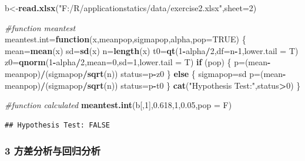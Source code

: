 \documentclass[]{article}
\newenvironment{Shaded}{\begin{snugshade}}{\end{snugshade}}
\newcommand{\KeywordTok}[1]{\textcolor[rgb]{0.13,0.29,0.53}{\textbf{#1}}}
\newcommand{\DataTypeTok}[1]{\textcolor[rgb]{0.13,0.29,0.53}{#1}}
\newcommand{\DecValTok}[1]{\textcolor[rgb]{0.00,0.00,0.81}{#1}}
\newcommand{\FloatTok}[1]{\textcolor[rgb]{0.00,0.00,0.81}{#1}}
\newcommand{\StringTok}[1]{\textcolor[rgb]{0.31,0.60,0.02}{#1}}
\newcommand{\CommentTok}[1]{\textcolor[rgb]{0.56,0.35,0.01}{\textit{#1}}}
\newcommand{\OtherTok}[1]{\textcolor[rgb]{0.56,0.35,0.01}{#1}}
\newcommand{\ControlFlowTok}[1]{\textcolor[rgb]{0.13,0.29,0.53}{\textbf{#1}}}
\newcommand{\OperatorTok}[1]{\textcolor[rgb]{0.81,0.36,0.00}{\textbf{#1}}}
\newcommand{\NormalTok}[1]{#1}
\begin{document}
\begin{Shaded}
\begin{Highlighting}[]
\NormalTok{b<-}\KeywordTok{read.xlsx}\NormalTok{(}\StringTok{"F:/R/applicationstatics/data/exercise2.xlsx"}\NormalTok{,}\DataTypeTok{sheet=}\DecValTok{2}\NormalTok{)}

\CommentTok{#function meantest}
\NormalTok{meantest.int=}\ControlFlowTok{function}\NormalTok{(x,meanpop,sigmapop,alpha,}\DataTypeTok{pop=}\OtherTok{TRUE}\NormalTok{) \{}
\NormalTok{  mean=}\KeywordTok{mean}\NormalTok{(x)}
\NormalTok{  sd=}\KeywordTok{sd}\NormalTok{(x)}
\NormalTok{  n=}\KeywordTok{length}\NormalTok{(x)}
\NormalTok{  t0=}\KeywordTok{qt}\NormalTok{(}\DecValTok{1}\OperatorTok{-}\NormalTok{alpha}\OperatorTok{/}\DecValTok{2}\NormalTok{,}\DataTypeTok{df=}\NormalTok{n}\OperatorTok{-}\DecValTok{1}\NormalTok{,}\DataTypeTok{lower.tail =}\NormalTok{ T)}
\NormalTok{  z0=}\KeywordTok{qnorm}\NormalTok{(}\DecValTok{1}\OperatorTok{-}\NormalTok{alpha}\OperatorTok{/}\DecValTok{2}\NormalTok{,}\DataTypeTok{mean=}\DecValTok{0}\NormalTok{,}\DataTypeTok{sd=}\DecValTok{1}\NormalTok{,}\DataTypeTok{lower.tail =}\NormalTok{ T)}
  \ControlFlowTok{if}\NormalTok{ (pop) \{}
\NormalTok{    p=(mean}\OperatorTok{-}\NormalTok{meanpop)}\OperatorTok{/}\NormalTok{(sigmapop}\OperatorTok{/}\KeywordTok{sqrt}\NormalTok{(n))}
\NormalTok{    status=p}\OperatorTok{-}\NormalTok{z0}
\NormalTok{  \} }\ControlFlowTok{else}\NormalTok{ \{}
\NormalTok{    sigmapop=sd}
\NormalTok{    p=(mean}\OperatorTok{-}\NormalTok{meanpop)}\OperatorTok{/}\NormalTok{(sigmapop}\OperatorTok{/}\KeywordTok{sqrt}\NormalTok{(n))}
\NormalTok{    status=p}\OperatorTok{-}\NormalTok{t0}
\NormalTok{  \}}
  \KeywordTok{cat}\NormalTok{(}\StringTok{"Hypothesis Test:"}\NormalTok{,status}\OperatorTok{>}\DecValTok{0}\NormalTok{)}
\NormalTok{\}}

\CommentTok{#function calculated}
\KeywordTok{meantest.int}\NormalTok{(b[,}\DecValTok{1}\NormalTok{],}\FloatTok{0.618}\NormalTok{,}\DecValTok{1}\NormalTok{,}\FloatTok{0.05}\NormalTok{,}\DataTypeTok{pop =}\NormalTok{ F)}
\end{Highlighting}
\end{Shaded}

\begin{verbatim}
## Hypothesis Test: FALSE
\end{verbatim}

\subsubsection{3 方差分析与回归分析}
\end{document}
